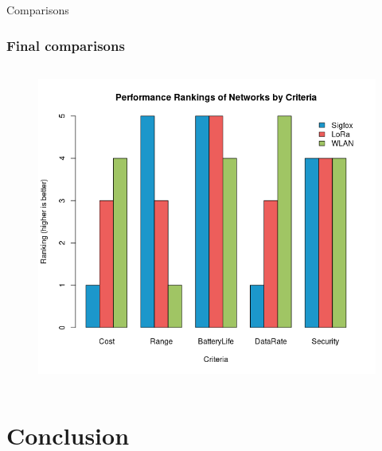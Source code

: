 \documentclass{beamer}
\begin{document}
\begin{frame}{Comparisons}
  \frametitle{Final comparisons}
  \begin{columns}
    \begin{column}{\textheight}
      \begin{figure}[htbp]
        \centering
        \includegraphics[width=\textwidth]{images/Network_Comparison_barplot.png}
        \label{fig:Network_comparison_barplot}
      \end{figure}
    \end{column}
  \end{columns}
\end{frame}

\section{Conclusion}
\end{document}
